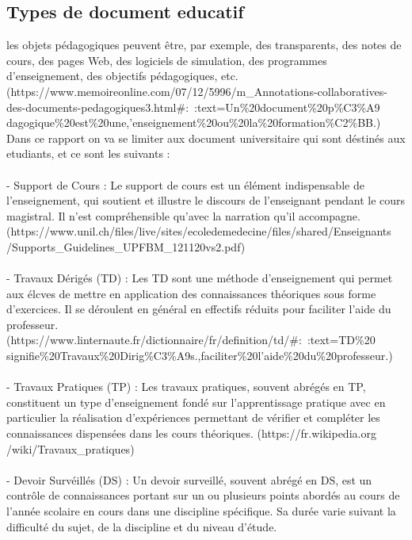 \documentclass[12pt]{report}
\begin{document}
\subsection{Types de document educatif}

les objets pédagogiques peuvent être, par exemple, des transparents, des notes de cours, des pages Web, des logiciels de simulation, des programmes d'enseignement, des objectifs pédagogiques, etc.
\\(https://www.memoireonline.com/07/12/5996/m\_Annotations-collaboratives-des-documents-pedagogiques3.html\#:~:text=Un\%20document\%20p\%C3\%A9\\dagogique\%20est\%20une,'enseignement\%20ou\%20la\%20formation\%C2\%BB.)\\

Dans ce rapport on va se limiter aux document universitaire qui sont
déstinés aux etudiants, et ce sont les suivants :\\\\
- Support de Cours : Le support de cours est un élément indispensable de l'enseignement, qui soutient et illustre le discours de l'enseignant pendant le cours magistral. Il n'est compréhensible qu'avec la narration qu'il accompagne. \\
(https://www.unil.ch/files/live/sites/ecoledemedecine/files/shared/Enseignants\\/Supports\_Guidelines\_UPFBM\_121120vs2.pdf)\\
\\- Travaux Dérigés (TD) : Les TD sont une méthode d'enseignement qui permet aux élcves de mettre en application des connaissances théoriques sous forme d'exercices. Il se déroulent en général en effectifs réduits pour faciliter l'aide du professeur. \\
(https://www.linternaute.fr/dictionnaire/fr/definition/td/\#:~:text=TD\%20\\signifie\%20Travaux\%20Dirig\%C3\%A9s.,faciliter\%20l'aide\%20du\%20professeur.)\\
\\- Travaux Pratiques (TP) : Les travaux pratiques, souvent abrégés en TP, constituent un type d'enseignement fondé sur l'apprentissage pratique avec en particulier la réalisation d'expériences permettant de vérifier et compléter les connaissances dispensées dans les cours théoriques.
(https://fr.wikipedia.org\\/wiki/Travaux\_pratiques)\\
\\- Devoir Survéillés (DS) : Un devoir surveillé, souvent abrégé en DS, est un contrôle de connaissances portant sur un ou plusieurs points abordés au cours de l'année scolaire en cours dans une discipline spécifique. Sa durée varie suivant la difficulté du sujet, de la discipline et du niveau d'étude.
\end{document}
